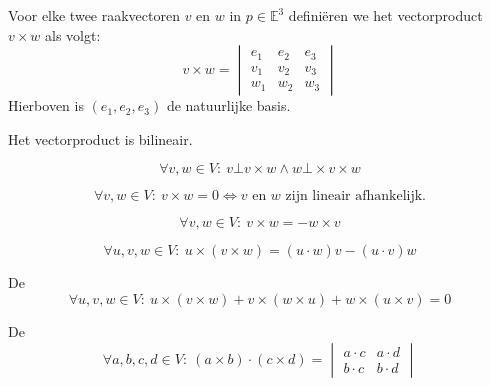 \documentclass[main.tex]{subfiles}
\begin{document}
\begin{de}
  Voor elke twee raakvectoren $v$ en $w$ in $p\in \mathbb{E}^{3}$ defini\"eren we het vectorproduct $v\times w$ als volgt:
  \[
  v \times w =
  \begin{vmatrix}
    e_{1} & e_{2} & e_{3}\\
    v_{1} & v_{2} & v_{3}\\
    w_{1} & w_{2} & w_{3}
  \end{vmatrix}
  \]
  Hierboven is $(e_{1},e_{2},e_{3})$ de natuurlijke basis.
\end{de}

\begin{st}
  Het vectorproduct is bilineair.
\end{st}

\begin{st}
  \[ \forall v,w \in V:\ v \bot v\times w \wedge w \bot \times v\times w \]
\end{st}

\begin{st}
  \[ \forall v,w \in V:\ v\times w = 0 \Leftrightarrow v \text{ en } w \text{ zijn lineair afhankelijk.} \]
\end{st}

\begin{st}
  \[ \forall v,w \in V:\ v\times w = - w\times v \]
\end{st}

\begin{st}
  \[ \forall u,v,w \in V:\ u \times (v \times w) = (u \cdot w)v - (u \cdot v)w \]
\end{st}

\begin{st}
  De \\
  \[ \forall u,v,w \in V:\ u \times (v \times w) + v \times (w \times u) + w \times (u \times v) = 0 \]
\end{st}

\begin{st}
  De \\
  \[
  \forall a,b,c,d \in V:\ (a\times b) \cdot (c \times d) =
  \begin{vmatrix}
    a \cdot c & a \cdot d\\
    b \cdot c & b \cdot d
  \end{vmatrix}
  \]
\end{st}
\end{document}
